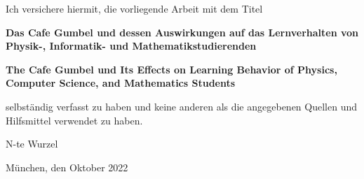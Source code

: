 \documentclass[a4paper,11pt,twoside,openright]{report}
\begin{document}
Ich versichere hiermit, die vorliegende Arbeit mit dem Titel

\begin{center}
	\textbf{Das Cafe Gumbel und dessen Auswirkungen auf das Lernverhalten von Physik-, Informatik- und Mathematikstudierenden}\\
\end{center}
\begin{center}
	\textbf{The Cafe Gumbel und Its Effects on Learning Behavior of Physics, Computer Science, and Mathematics Students}
\end{center}

selbst{\"a}ndig verfasst zu haben und keine anderen als die angegebenen Quellen und Hilfsmittel verwendet zu haben.

\vspace*{3cm}

N-te Wurzel

\vspace*{1cm}
M{\"u}nchen, den \hspace*{2cm} Oktober 2022
\end{document}
